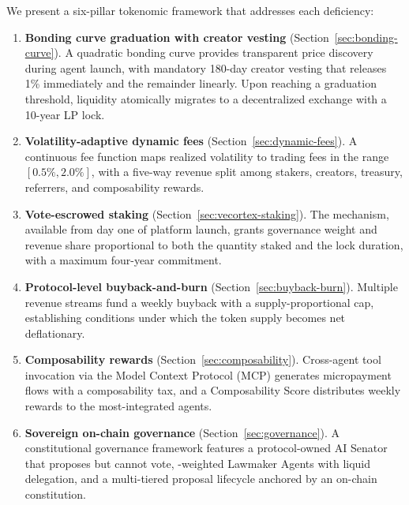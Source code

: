 We present a six-pillar tokenomic framework that addresses each deficiency:

\begin{enumerate}
  \item \textbf{Bonding curve graduation with creator vesting}
    (Section~\ref{sec:bonding-curve}). A quadratic bonding curve provides
    transparent price discovery during agent launch, with mandatory 180-day
    creator vesting that releases 1\% immediately and the remainder linearly.
    Upon reaching a graduation threshold, liquidity atomically migrates to a
    decentralized exchange with a 10-year LP lock.

  \item \textbf{Volatility-adaptive dynamic fees}
    (Section~\ref{sec:dynamic-fees}). A continuous fee function maps realized
    volatility to trading fees in the range $[0.5\%, 2.0\%]$, with a five-way
    revenue split among stakers, creators, treasury, referrers, and
    composability rewards.

  \item \textbf{Vote-escrowed staking} (Section~\ref{sec:vecortex-staking}).
    The \veCORTEX{} mechanism, available from day one of platform launch,
    grants governance weight and revenue share proportional to both the quantity
    staked and the lock duration, with a maximum four-year commitment.

  \item \textbf{Protocol-level buyback-and-burn}
    (Section~\ref{sec:buyback-burn}). Multiple revenue streams fund a weekly
    buyback with a supply-proportional cap, establishing conditions under which
    the token supply becomes net deflationary.

  \item \textbf{Composability rewards} (Section~\ref{sec:composability}).
    Cross-agent tool invocation via the Model Context Protocol (MCP) generates
    micropayment flows with a composability tax, and a Composability Score
    distributes weekly rewards to the most-integrated agents.

  \item \textbf{Sovereign on-chain governance}
    (Section~\ref{sec:governance}). A constitutional governance framework
    features a protocol-owned AI Senator that proposes but cannot vote,
    \veCORTEX{}-weighted Lawmaker Agents with liquid delegation, and a
    multi-tiered proposal lifecycle anchored by an on-chain constitution.
\end{enumerate}

